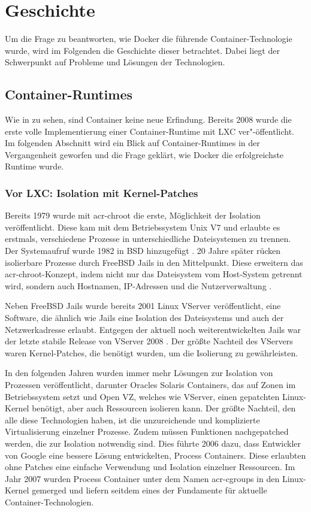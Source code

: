 \chapter{Geschichte}
\label{chap:geschichte}
Um die Frage zu beantworten, wie Docker die führende Container-Technologie wurde, wird im Folgenden die Geschichte dieser betrachtet. Dabei liegt der Schwerpunkt auf Probleme und Lösungen der Technologien.
 
\section{Container-Runtimes}
\label{sec:lxc2containerd}
Wie in  zu sehen, sind Container keine neue Erfindung. Bereits 2008 wurde die erste volle Implementierung einer Container-Runtime mit LXC ver"-öffentlicht. Im folgenden Abschnitt wird ein Blick auf Container-Runtimes in der Vergangenheit geworfen und die Frage geklärt, wie Docker die erfolgreichste Runtime wurde.

\subsection{Vor LXC: Isolation mit Kernel-Patches}
\label{sec:geschichteVorLXC}

Bereits 1979 wurde mit \gls{acr-chroot} die erste, Möglichkeit der Isolation veröffentlicht. Diese kam mit dem Betriebssystem Unix V7 und erlaubte es erstmals, verschiedene Prozesse in unterschiedliche Dateisystemen zu trennen. Der Systemaufruf wurde 1982 in BSD hinzugefügt \citep{ABriefHistoryofContainers:fromthe1970sto2017}. 20 Jahre später rücken isolierbare Prozesse durch FreeBSD Jails in den Mittelpunkt. Diese erweitern das \Gls{acr-chroot}-Konzept, indem nicht nur das Dateisystem vom Host-System getrennt wird, sondern auch Hostnamen, IP-Adressen und die Nutzerverwaltung \citep{FreeBSDHandbook}. 

Neben FreeBSD Jails wurde bereits 2001 Linux VServer veröffentlicht, eine Software, die ähnlich wie Jails eine Isolation des Dateisystems und auch der Netzwerkadresse erlaubt. Entgegen der aktuell noch weiterentwickelten Jails war der letzte stabile Release von VServer 2008 \citep{PaperLinuxVServer}. Der größte Nachteil des VServers waren Kernel-Patches, die benötigt wurden, um die Isolierung zu gewährleisten.

In den folgenden Jahren wurden immer mehr Lösungen zur Isolation von Prozessen veröffentlicht, darunter Oracles Solaris Containers, das auf Zonen im Betriebssystem setzt und Open VZ, welches wie VServer, einen gepatchten Linux-Kernel benötigt, aber auch Ressourcen isolieren kann. Der größte Nachteil, den alle diese Technologien haben, ist die unzureichende und komplizierte Virtualisierung einzelner Prozesse. Zudem müssen Funktionen nachgepatched werden, die zur Isolation notwendig sind. Dies führte 2006 dazu, dass Entwickler von Google eine bessere Lösung entwickelten, Process Containers. Diese erlaubten ohne Patches eine einfache Verwendung und Isolation einzelner Ressourcen. Im Jahr 2007 wurden Process Container unter dem Namen \glspl{acr-cgroup} in den Linux-Kernel gemerged und liefern seitdem eines der Fundamente für aktuelle Container-Technologien.

